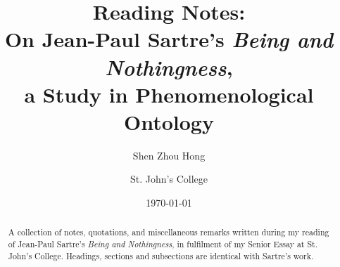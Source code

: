 \documentclass[
  10pt,       %
  letterpaper,    %
  final,      %
  onecolumn,  %
  oneside,    %
  notitlepage %
]{article}
\title{
  \textbf{Reading Notes:} \\
  On Jean-Paul Sartre's \emph{Being and Nothingness},\\
  a Study in Phenomenological Ontology
}
\author{
  Shen Zhou Hong \and St. John's College
}
\date{\today}
\begin{document}
\maketitle
\begin{abstract}
\noindent A collection of notes, quotations, and miscellaneous remarks written during my reading of Jean-Paul Sartre's \emph{Being and Nothingness}, in fulfilment of my Senior Essay at St. John's College. Headings, sections and subsections are identical with Sartre's work.
\end{abstract}
\tableofcontents %

% 













\appendix

\end{document}
